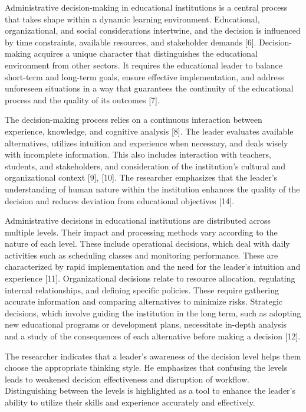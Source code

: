 \documentclass[10pt]{NSP1}
\begin{document}
Administrative decision-making in educational institutions is a central process that takes shape within a dynamic learning environment. Educational, organizational, and social considerations intertwine, and the decision is influenced by time constraints, available resources, and stakeholder demands [6]. Decision-making acquires a unique character that distinguishes the educational environment from other sectors. It requires the educational leader to balance short-term and long-term goals, ensure effective implementation, and address unforeseen situations in a way that guarantees the continuity of the educational process and the quality of its outcomes [7].

The decision-making process relies on a continuous interaction between experience, knowledge, and cognitive analysis [8]. The leader evaluates available alternatives, utilizes intuition and experience when necessary, and deals wisely with incomplete information. This also includes interaction with teachers, students, and stakeholders, and consideration of the institution's cultural and organizational context [9], [10]. The researcher emphasizes that the leader's understanding of human nature within the institution enhances the quality of the decision and reduces deviation from educational objectives [14].

\par\medskip{}\smallskip

Administrative decisions in educational institutions are distributed across multiple levels. Their impact and processing methods vary according to the nature of each level. These include operational decisions, which deal with daily activities such as scheduling classes and monitoring performance. These are characterized by rapid implementation and the need for the leader's intuition and experience [11]. Organizational decisions relate to resource allocation, regulating internal relationships, and defining specific policies. These require gathering accurate information and comparing alternatives to minimize risks. Strategic decisions, which involve guiding the institution in the long term, such as adopting new educational programs or development plans, necessitate in-depth analysis and a study of the consequences of each alternative before making a decision [12].

The researcher indicates that a leader's awareness of the decision level helps them choose the appropriate thinking style. He emphasizes that confusing the levels leads to weakened decision effectiveness and disruption of workflow. Distinguishing between the levels is highlighted as a tool to enhance the leader's ability to utilize their skills and experience accurately and effectively.
\end{document}
